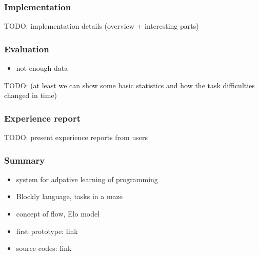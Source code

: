 \documentclass[xcolor=dvipsnames, 14pt]{beamer}
\begin{document}
\begin{frame}
\frametitle{Implementation}
TODO: implementation details (overview + interesting parts)
\end{frame}

\begin{frame}
\frametitle{Evaluation}
\begin{itemize}
\item not enough data
\end{itemize}
TODO: (at least we can show some basic statistics and how the task difficulties changed in time)
\end{frame}

\begin{frame}
\frametitle{Experience report}
TODO: present experience reports from users
\end{frame}

\begin{frame}
\frametitle{Summary}
\begin{itemize}
\item system for adpative learning of programming
\item Blockly language, tasks in a maze
\item concept of flow, Elo model
\item first prototype: link
\item source codes: link
\end{itemize}
\end{frame}
\end{document}
